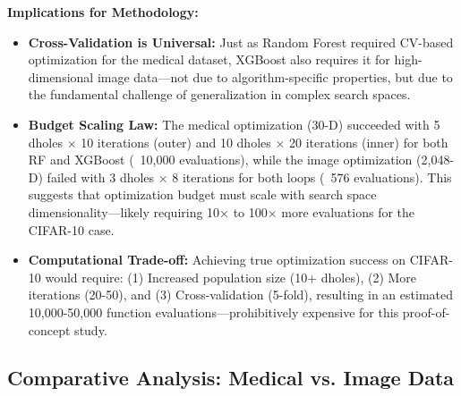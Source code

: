 \documentclass[12pt, a4paper]{article}
\begin{document}
\textbf{Implications for Methodology:}
\begin{itemize}
    \item \textbf{Cross-Validation is Universal:} Just as Random Forest required CV-based optimization for the medical dataset, XGBoost also requires it for high-dimensional image data—not due to algorithm-specific properties, but due to the fundamental challenge of generalization in complex search spaces.
    
    \item \textbf{Budget Scaling Law:} The medical optimization (30-D) succeeded with 5 dholes × 10 iterations (outer) and 10 dholes × 20 iterations (inner) for both RF and XGBoost (~10,000 evaluations), while the image optimization (2,048-D) failed with 3 dholes × 8 iterations for both loops (~576 evaluations). This suggests that optimization budget must scale with search space dimensionality—likely requiring 10× to 100× more evaluations for the CIFAR-10 case.
    
    \item \textbf{Computational Trade-off:} Achieving true optimization success on CIFAR-10 would require: (1) Increased population size (10+ dholes), (2) More iterations (20-50), and (3) Cross-validation (5-fold), resulting in an estimated 10,000-50,000 function evaluations—prohibitively expensive for this proof-of-concept study.
\end{itemize}

\subsection{Comparative Analysis: Medical vs. Image Data}
\end{document}
